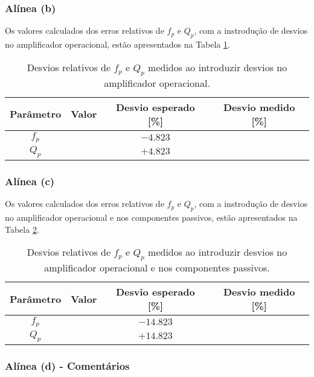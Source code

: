 \subsubsection*{Alínea (b)}

Os valores calculados dos erros relativos de $f_p$ e $Q_p$, com a instrodução de desvios no amplificador operacional, estão apresentados na Tabela \ref{tab:param_exp_desvios_act}.

\begin{table}[!ht]
\centering
\begin{tabular}{|c|c|c|c|}
\hline
{Parâmetro} &{ Valor} & Desvio esperado [\%] & Desvio medido [\%] \\
\hline\hline
$f_p$ & \quad\quad\quad\quad\quad\quad\quad & $-4.823$ & \quad\quad\quad\quad\quad\quad\quad  \\
\hline
$Q_p$ && $+4.823$ & \\
\hline
\end{tabular}
\caption{Desvios relativos de $f_p$ e $Q_p$ medidos ao introduzir desvios no amplificador operacional.}
\label{tab:param_exp_desvios_act}
\end{table}

\subsubsection*{Alínea (c)}

Os valores calculados dos erros relativos de $f_p$ e $Q_p$, com a instrodução de desvios no amplificador operacional e nos componentes passivos, estão apresentados na Tabela \ref{tab:param_exp_desvios_all}.

\begin{table}[!ht]
\centering
\begin{tabular}{|c|c|c|c|}
\hline
{Parâmetro} &{ Valor} & Desvio esperado [\%] & Desvio medido [\%] \\
\hline\hline
$f_p$ & \quad\quad\quad\quad\quad\quad\quad & $-14.823$ & \quad\quad\quad\quad\quad\quad\quad  \\
\hline
$Q_p$ && $+14.823$ & \\
\hline
\end{tabular}
\caption{Desvios relativos de $f_p$ e $Q_p$ medidos ao introduzir desvios no amplificador operacional e nos componentes passivos.}
\label{tab:param_exp_desvios_all}
\end{table}

\subsubsection*{Alínea (d) - Comentários}

